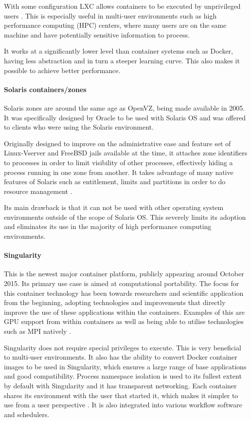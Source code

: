 With some configuration LXC allows containers to be executed by unprivileged users \parencite{linuxcontainerscom}. This is especially useful in multi-user environments such as high performance computing (HPC) centers, where many users are on the same machine and have potentially sensitive information to process.

It works at a significantly lower level than container systems such as Docker, having less abstraction and in turn a steeper learning curve. This also makes it possible to achieve better performance.

\paragraph{Solaris containers/zones}
Solaris zones are around the same age as OpenVZ, being made available in 2005. It was specifically designed by Oracle to be used with Solaris OS and was offered to clients who were using the Solaris environment. 

Originally designed to improve on the administrative ease and feature set of Linux-Vserver and FreeBSD jails available at the time, it attaches zone identifiers to processes in order to limit visibility of other processes, effectively hiding a process running in one zone from another. It takes advantage of many native features of Solaris such as entitlement, limits and partitions in order to do resource management \parencite{price2004solaris}.

Its main drawback is that it can not be used with other operating system environments outside of the scope of Solaris OS. This severely limits its adoption and eliminates its use in the majority of high performance computing environments.

\paragraph{Singularity}
This is the newest major container platform, publicly appearing around October 2015. Its primary use case is aimed at computational portability. The focus for this container technology has been towards researchers and scientific application from the beginning, adopting technologies and improvements that directly improve the use of these applications within the containers. Examples of this are GPU support from within containers as well as being able to utilise technologies such as MPI natively \parencite{arango2017performance,benedicic2017portable}.

Singularity does not require special privileges to execute. This is very beneficial to multi-user environments. It also has the ability to convert Docker container images to be used in Singularity, which ensures a large range of base applications and good compatibility. Process namespace isolation is used to its fullest extent by default with Singularity and it has transparent networking. Each container shares its environment with the user that started it, which makes it simpler to use from a user perspective \parencite{xavier2013performance}. It is also integrated into various workflow software and schedulers.

